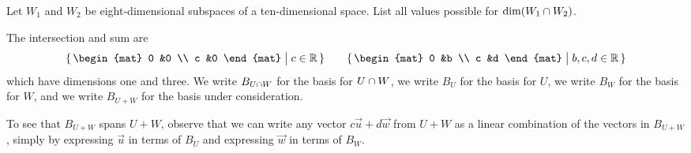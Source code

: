 \begin{exercises}
\begin{exparts}
      \partsitem Let \( W_1 \) and \( W_2 \) be eight-dimensional 
        subspaces of a ten-di\-men\-sion\-al space.
       List all values possible for \( \dim(W_1\cap W_2) \).
    \end{exparts}
    \begin{answer}
      \begin{exparts}
        \partsitem The intersection and sum are
          \begin{equation*}
             \set{\begin{mat}
                    0  &0  \\
                    c  &0
                  \end{mat} \suchthat c\in\Re  }
             \qquad
             \set{\begin{mat}
                    0  &b  \\
                    c  &d
                   \end{mat} \suchthat b,c,d\in\Re  }
          \end{equation*}
        which have dimensions one and three.
      \partsitem We write $B_{U\cap W}$ for the basis for 
        $U\cap W$,
        we write $B_U$ for the basis for $U$, 
        we write $B_W$ for the basis for $W$,
        and we write $B_{U+W}$ for the basis under consideration.

        To see that $B_{U+W}$ spans $U+W$, observe that we can write
        any vector $c\vec{u}+d\vec{w}$ from $U+W$ as a linear
        combination of the vectors in $B_{U+W}$, 
        simply by expressing $\vec{u}$ in 
        terms of $B_U$ and expressing $\vec{w}$ in terms of $B_W$.


\end{exparts}
\end{answer}
\end{exercises}
